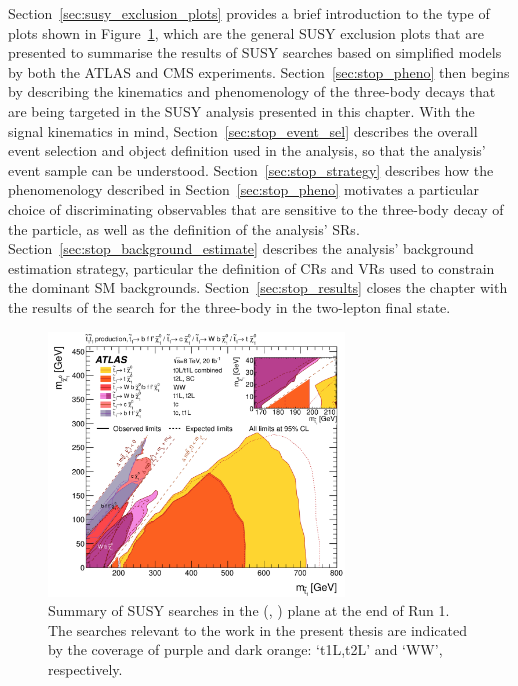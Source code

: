 Section~\ref{sec:susy_exclusion_plots} provides a brief introduction to the type of plots
shown in Figure~\ref{fig:run1_stop_summary}, which are the general SUSY exclusion plots
that are presented to summarise the results of SUSY searches based on simplified models
by both the ATLAS and CMS experiments.
Section~\ref{sec:stop_pheno} then begins by describing the kinematics and phenomenology of the three-body \stopone
decays that are being targeted in the SUSY analysis presented in this chapter.
With the signal kinematics in mind, Section~\ref{sec:stop_event_sel} describes the overall event
selection and object definition used in the analysis, so that the analysis' event sample can be understood.
Section~\ref{sec:stop_strategy} describes how the phenomenology described in Section~\ref{sec:stop_pheno}
motivates a particular choice of discriminating observables that are sensitive to the three-body decay
of the \stopone particle, as well as the definition of the analysis' SRs.
Section~\ref{sec:stop_background_estimate} describes the analysis' background estimation
strategy, particular the definition of CRs and VRs used to constrain the dominant
SM backgrounds.
Section~\ref{sec:stop_results} closes the chapter with the results of the search for
the three-body \stopone in the two-lepton final state.


\begin{figure}[!htb]
    \begin{center}
        \includegraphics[width=0.7\textwidth]{figures/search_stop2l/run1_stop_summary}
        \caption{
            Summary of SUSY \stopone searches in the (\stopone, \ninoone) plane
            at the end of Run 1.
            The searches relevant to the work in the present thesis are indicated by the 
            coverage of purple and dark orange: `t1L,t2L' and `WW', respectively.
        }
        \label{fig:run1_stop_summary}
    \end{center}
\end{figure}

